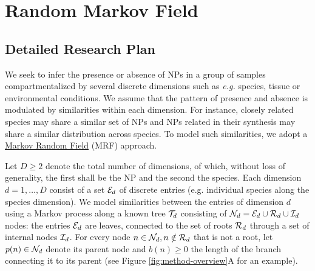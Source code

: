 \documentclass[
11pt, %
oneside, %
english, %
singlespacing, %
headsepline, %
chapterinoneline, %
]{MastersDoctoralThesis} %
\def\E{\mathbb{E}}
\def\E{{\cal E}}
\def\I{{\cal I}}
\def\N{{\cal N}}
\def\R{{\cal R}}
\def\T{{\cal T}}
\begin{document}
\mainmatter %

\pagestyle{thesis} %


%
% 
%
% 
% 
%

\chapter{Random Markov Field}
\section{Detailed Research Plan}
We seek to infer the presence or absence of NPs in a group of samples compartmentalized by several discrete dimensions such as \textit{e.g.} species, tissue or environmental conditions. We assume that the pattern of presence and absence is modulated by similarities within each dimension. For instance, closely related species may share a similar set of NPs and NPs related in their synthesis may share a similar distribution across species. To model such similarities, we adopt a \href{https://en.wikipedia.org/wiki/Markov_random_field}{Markov Random Field} (MRF) approach.

Let $D\geq2$ denote the total number of dimensions, of which, without loss of generality, the first shall be the NP and the second the species. Each dimension $d=1, \ldots, D$ consist of a set $\E_d$ of discrete entries (e.g. individual species along the species dimension). We model similarities between the entries of dimension $d$ using a Markov process along a known tree $\T_d$ consisting of $\N_d = \E_d \cup \R_d \cup \I_d$ nodes: the entries $\E_d$ are leaves, connected to the set of roots $\R_d$ through a set of internal nodes $\I_d$. For every node $n \in \N_d, n \notin \R_d$ that is not a root, let $p(n) \in \N_d$ denote its parent node and $b(n) \geq 0$ the length of the branch connecting it to its parent (see Figure \ref{fig:method-overview}A for an example).
\end{document}
